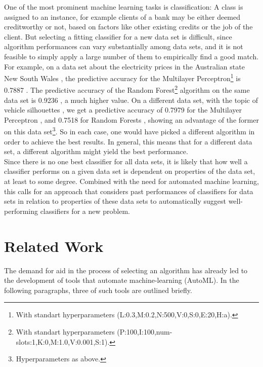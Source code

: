 \documentclass[12pt]{scrartcl}
\begin{document}
One of the most prominent machine learning tasks is classification: A class is assigned to an instance, for example clients of a bank may be either deemed creditworthy or not, based on factors like other existing credits or the job of the client. But selecting a fitting classifier for a new data set is difficult, since algorithm performances can vary substantially among data sets, and it is not feasible to simply apply a large number of them to empirically find a good match. For example, on a data set about the electricity prices in the Australian state New South Wales \cite{harris1999splice}, the predictive accuracy for the Multilayer Perceptron\footnote{With standart hyperparameters (L:0.3,M:0.2,N:500,V:0,S:0,E:20,H:a).} is 0.7887 \cite{cachada2017run3}. The predictive accuracy of the Random Forest\footnote{With standart hyperparameters (P:100,I:100,num-slots:1,K:0,M:1.0,V:0.001,S:1).} algorithm on the same data set is 0.9236 \cite{cachada2017run}, a much higher value. On a different data set, with the topic of vehicle silhouettes \cite{siebert1987vehicle}, we get a predictive accuracy of 0.7979 for the Multilayer Perceptron \cite{cachada2017run4}, and 0.7518 for Random Forests \cite{cachada2017run2}, showing an advantage of the former on this data set\footnote{Hyperparameters as above.}. So in each case, one would have picked a different algorithm in order to achieve the best results. In general, this means that for a different data set, a different algorithm might yield the best performance.\\
 
Since there is no one best classifier for all data sets, it is likely that how well a classifier performs on a given data set is dependent on properties of the data set, at least to some degree. Combined with the need for automated machine learning, this calls for an approach that considers past performances of classifiers for data sets in relation to properties of these data sets to automatically suggest well-performing classifiers for a new problem.

\section{Related Work}\label{sec:related_work}
The demand for aid in the process of selecting an algorithm has already led to the development of tools that automate machine-learning (AutoML). In the following paragraphs, three of such tools are outlined briefly.\\
\end{document}
